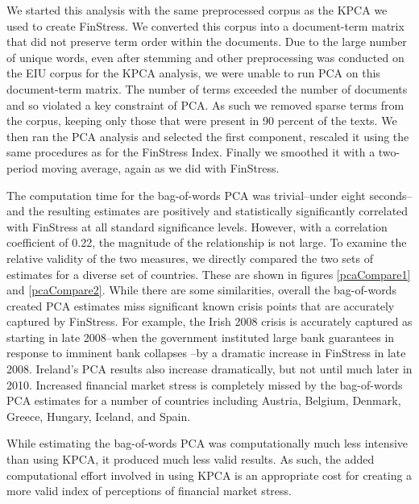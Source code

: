 \documentclass[]{article}
\begin{document}
We started this analysis with the same preprocessed corpus as the KPCA we used to create FinStress. We converted this corpus into a document-term matrix that did not preserve term order within the documents. Due to the large number of unique words, even after stemming and other preprocessing was conducted on the EIU corpus for the KPCA analysis, we were unable to run PCA on this document-term matrix. The number of terms exceeded the number of documents and so violated a key constraint of PCA. As such we removed sparse terms from the corpus, keeping only those that were present in 90 percent of the texts. We then ran the PCA analysis and selected the first component, rescaled it using the same procedures as for the FinStress Index. Finally we smoothed it with a two-period moving average, again as we did with FinStress.

The computation time for the bag-of-words PCA was trivial--under eight seconds--and the resulting estimates are positively and statistically significantly correlated with FinStress at all standard significance levels. However, with a correlation coefficient of 0.22, the magnitude of the relationship is not large. To examine the relative validity of the two measures, we directly compared the two sets of estimates for a diverse set of countries. These are shown in figures \ref{pcaCompare1} and \ref{pcaCompare2}. While there are some similarities, overall the bag-of-words created PCA estimates miss significant known crisis points that are accurately captured by FinStress. For example, the Irish 2008 crisis is accurately captured as starting in late 2008--when the government instituted large bank guarantees in response to imminent bank collapses \citep{gandrud_okeeffe2016}--by a dramatic increase in FinStress in late 2008. Ireland's PCA results also increase dramatically, but not until much later in 2010. Increased financial market stress is completely missed by the bag-of-words PCA estimates for a number of countries including Austria, Belgium, Denmark, Greece, Hungary, Iceland, and Spain.

While estimating the bag-of-words PCA was computationally much less intensive than using KPCA, it produced much less valid results. As such, the added computational effort involved in using KPCA is an appropriate cost for creating a more valid index of perceptions of financial market stress.
\end{document}
